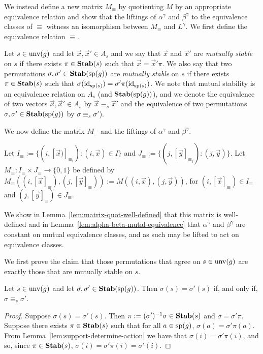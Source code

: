 \documentclass[../main/thesis.tex]{subfiles}
\begin{document}
We instead define a new matrix $M_{\equiv}$ by quotienting $M$ by an appropriate
equivalence relation and show that the liftings of $\alpha^{\gamma}$ and
$\beta^{\gamma}$ to the equivalence classes of $\equiv$ witness an isomorphism
between $M_\equiv$ and $L^{\gamma}$. We first define the equivalence relation
$\equiv$.

Let $s \in \text{unv}(g)$ and let $\vec{x}, \vec{x}' \in A_s$ and we say that
$\vec{x}$ and $\vec{x}'$ are \emph{mutually stable} on $s$ if there exists $\pi
\in \text{\textbf{Stab}}(s)$ such that $\vec{x}= \vec{x}'\pi$. We also say that two
permutations $\sigma, \sigma' \in \text{\textbf{Stab}} (\text{sp} (g))$ are \emph{mutually stable} on $s$
if there exists $\pi \in \text{\textbf{Stab}}(s)$ such that $\sigma (\operatorname{id}_{\text{sp}(s)}) = \sigma'
\pi (\operatorname{id}_{\text{sp}(s)}) $. We note that mutual stability is an equivalence
relation on $A_s$ (and $\text{\textbf{Stab}} (\text{sp} (g))$), and we denote the equivalence of two
vectors $\vec{x}, \vec{x}' \in A_s$ by $\vec{x} \equiv_s \vec{x}'$ and the
equivalence of two permutations $\sigma, \sigma' \in \text{\textbf{Stab}} (\text{sp} (g))$ by $\sigma
\equiv_s \sigma'$).

We now define the matrix $M_{\equiv}$ and the liftings of $\alpha^{\gamma}$ and
$\beta^{\gamma}$.

Let $I_{\equiv} := \{(i, [\vec{x})]_{\equiv_i}) : (i, \vec{x}) \in I\}$ and
$J_\equiv := \{(j, [\vec{y}]_{\equiv_j}) : (j, \vec{y})\}$. Let $M_{\equiv} :
I_{\equiv} \times J_{\equiv} \rightarrow \{0,1\}$ be defined by $M_\equiv ((i,
[\vec{x}]_\equiv), (j, [\vec{y}]_\equiv)) := M((i,\vec{x}), (j, \vec{y}))$, for
$(i, [\vec{x}]_{\equiv}) \in I_\equiv$ and $(j, [\vec{y}]_{\equiv}) \in
J_\equiv$.

We show in Lemma~\ref{lem:matrix-quot-well-defined} that this matrix is
well-defined and in Lemma~\ref{lem:alpha-beta-mutal-equivalence} that
$\alpha^{\gamma}$ and $\beta^{\gamma}$ are constant on mutual equivalence
classes, and as such may be lifted to act on equivalence classes.

We first prove the claim that those permutations that agree on $s \in
\text{unv}(g)$ are exactly those that are mutually stable on $s$.

\begin{lem}
	Let $s \in \text{unv}(g)$ and let $\sigma, \sigma' \in \text{\textbf{Stab}}(\text{sp}(g))$. Then
  $\sigma(s) = \sigma' (s)$ if, and only if, $\sigma \equiv_s \sigma'$.
	\label{lem:functions-mutual-equivalence}
\end{lem}
\begin{proof}
	Suppose $\sigma(s) = \sigma'(s)$. Then $\pi := (\sigma')^{-1}\sigma \in
  \text{\textbf{Stab}}(s)$ and $\sigma = \sigma' \pi$. Suppose there exists $\pi \in \text{\textbf{Stab}}(s)$
  such that for all $a \in \text{sp}(g)$, $\sigma (a) = \sigma' \pi (a)$. From
  Lemma~\ref{lem:support-determine-action} we have that $\sigma (i) = \sigma'
  \pi (i)$, and so, since $\pi \in \text{\textbf{Stab}}(s)$, $\sigma(i) = \sigma' \pi (i) =
  \sigma' (i)$.
\end{proof}
\end{document}
